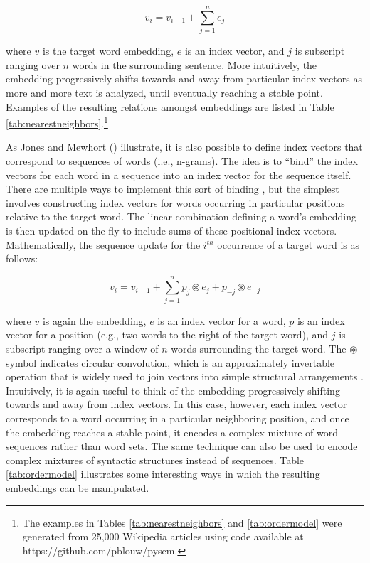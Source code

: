 \begin{equation}
v_{i}=v_{i-1}+ \sum_{j=1}^{n} {e_j}
\end{equation}

\noindent
where $v$ is the target word embedding, $e$ is an index vector, and $j$ is subscript ranging over $n$ words in the surrounding sentence. More intuitively, the embedding progressively shifts towards and away from particular index vectors as more and more text is analyzed, until eventually reaching a stable point. Examples of the resulting relations amongst embeddings are listed in Table \ref{tab:nearestneighbors}.\footnote{The examples in Tables \ref{tab:nearestneighbors} and \ref{tab:ordermodel} were generated from 25,000 Wikipedia articles using code available at https://github.com/pblouw/pysem.}

As Jones and Mewhort (\citeyear{JonesMewhort:2007}) illustrate, it is also possible to define index vectors that correspond to sequences of words (i.e., n-grams). The idea is to ``bind'' the index vectors for each word in a sequence into an index vector for the sequence itself. There are multiple ways to implement this sort of binding \citep[see e.g.,][]{Sahlgren:2008,JonesMewhort:2007,Blouw:2013}, but the simplest involves constructing index vectors for words occurring in particular positions relative to the target word. The linear combination defining a word's embedding is then updated on the fly to include sums of these positional index vectors. Mathematically, the sequence update for the $i^{th}$ occurrence of a target word is as follows:

\begin{equation}
v_{i}=v_{i-1}+ \sum_{j=1}^{n} {p_j \circledast e_{j} + p_{-j} \circledast e_{-j}}
\end{equation}

\noindent
where $v$ is again the embedding, $e$ is an index vector for a word, $p$ is an index vector for a position (e.g., two words to the right of the target word), and $j$ is subscript ranging over a window of $n$ words surrounding the target word. The $ \circledast $ symbol indicates circular convolution, which is an approximately invertable operation that is widely used to join vectors into simple structural arrangements \citep{Plate:2003}. Intuitively, it is again useful to think of the embedding progressively shifting towards and away from index vectors. In this case, however, each index vector corresponds to a word occurring in a particular neighboring position, and once the embedding reaches a stable point, it encodes a complex mixture of word sequences rather than word sets. The same technique can also be used to encode complex mixtures of syntactic structures instead of sequences. Table \ref{tab:ordermodel} illustrates some interesting ways in which the resulting embeddings can be manipulated.

